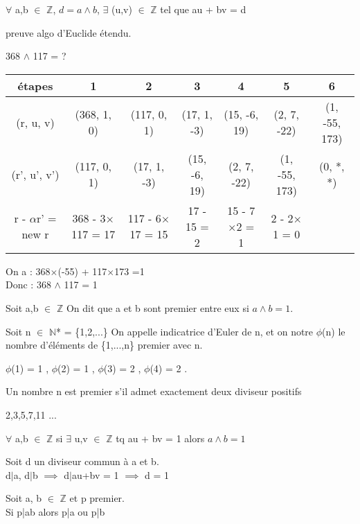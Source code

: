 \begin{prop}
	$\forall$ a,b $\in$ $\mathbb{Z}$, $d = a \wedge b$,
	$\exists$ (u,v) $\in$ $\mathbb{Z}$ tel que au + bv = d 
\end{prop}
\begin{dem}
	preuve algo d'Euclide étendu.
\end{dem}
\begin{ex}
	368 $\wedge$ 117 = ? \\
	\begin{tabular}{|c||c|c|c|c|c|c|}
		\hline
		étapes & 1 & 2 & 3 & 4 & 5 & 6\\
		\hline
		(r, u, v) & (368, 1, 0) & (117, 0, 1) & (17, 1, -3) & (15, -6, 19) & (2, 7, -22) & (1, -55, 173) \\ 
		\hline
		(r', u', v') & (117, 0, 1) & (17, 1, -3) & (15, -6, 19) & (2, 7, -22) & (1, -55, 173) & (0, *, *) \\ 
		\hline
		r - $\alpha$r' = new r & 368 - 3$\times$117 = 17 & 117 - 6$\times$17 = 15 & 17 - 15 = 2 & 15 - 7$\times$2 = 1 & 2 - 2$\times$1 = 0 &\\
		\hline
	\end{tabular}
	On a : 368$\times$(-55) + 117$\times$173 =1\\
	Donc : 368 $\wedge$ 117 = 1
\end{ex}
\begin{defi}
	Soit a,b $\in$ $\mathbb{Z}$ On dit que a et b sont premier entre eux si $a \wedge b = 1$.
\end{defi}
\begin{defi}
	Soit n $\in$ $\mathbb{N}$* = \{1,2,...\}
	On appelle indicatrice d'Euler de n, et on notre $\phi$(n) le nombre d'éléments de \{1,...,n\} premier avec n.
\end{defi}
\begin{ex}
	$\phi$(1) = 1 , 
	$\phi$(2) = 1 , 
	$\phi$(3) = 2 , 
	$\phi$(4) = 2 .
\end{ex}
\begin{defi}
	Un nombre n est premier s'il admet exactement deux diviseur positifs
\end{defi} 
\begin{ex}
	2,3,5,7,11 ...
\end{ex} 
\begin{thm}[Bézout]
	$\forall$ a,b $\in$ $\mathbb{Z}$ si $\exists$ u,v $\in$ $\mathbb{Z}$ tq au + bv = 1 alors $a \wedge b = 1$
\end{thm}
\begin{dem}
	Soit d un diviseur commun à a et b.\\
	d$\mid$a, d$\mid$b $\implies$ d$\mid$au+bv = 1 $\implies$ d = 1
\end{dem}
\begin{lem}
	Soit a, b $\in$ $\mathbb{Z}$ et p premier.\\
	Si p|ab alors p|a ou p|b
\end{lem}

